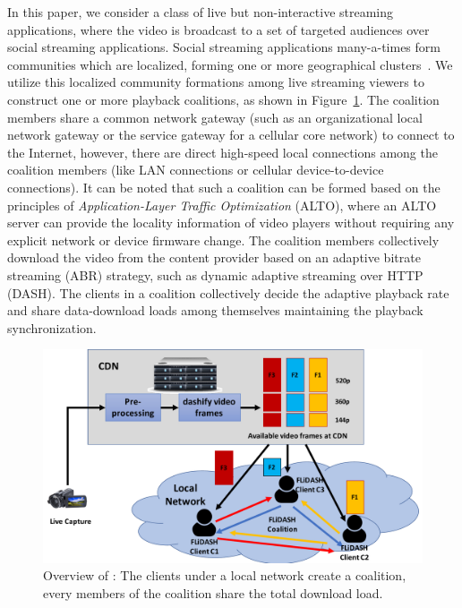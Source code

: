 In this paper, we consider a class of live but non-interactive streaming applications, where the video is broadcast to a set of targeted audiences over social streaming applications. Social streaming applications many-a-times form communities which are localized, forming one or more geographical clusters~\cite{wang2016anatomy}. We utilize this localized community formations among live streaming viewers to construct one or more playback coalitions, as shown in Figure~\ref{fig:chap06:flsd}. The coalition members share a common network gateway (such as an organizational local network gateway or the service gateway for a cellular core network) to connect to the Internet, however, there are direct high-speed local connections among the coalition members (like LAN connections or cellular device-to-device connections). It can be noted that such a coalition can be formed based on the principles of \textit{Application-Layer Traffic Optimization} (ALTO), where an ALTO server can provide the locality information of video players without requiring any explicit network or device firmware change. The coalition members collectively download the video from the content provider based on an adaptive bitrate streaming (ABR) strategy, such as dynamic adaptive streaming over HTTP (DASH).  The clients in a coalition collectively decide the adaptive playback rate and share data-download loads among themselves maintaining the playback synchronization. 
\begin{figure}[!ht]
    \centering
    \includegraphics[width=0.8\linewidth]{img/flsd.pdf}
    \caption{Overview of \our: The clients under a local network create a coalition, every members of the coalition share the total download load.}
    \label{fig:chap06:flsd}
\end{figure}

